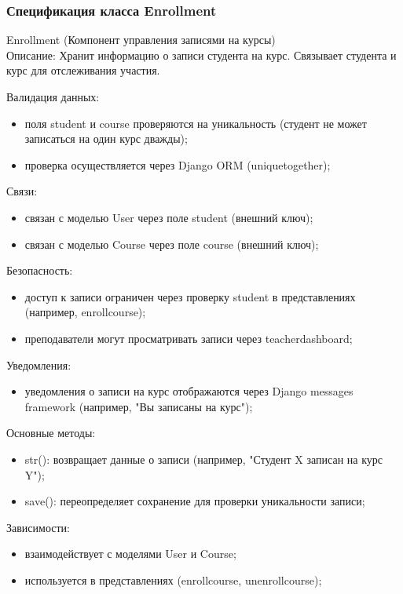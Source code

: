 \subsubsection{Спецификация класса Enrollment}
Enrollment (Компонент управления записями на курсы) \\
Описание: Хранит информацию о записи студента на курс. Связывает студента и курс для отслеживания участия.

Валидация данных: 
\begin{itemize}
	\item поля student и course проверяются на уникальность (студент не может записаться на один курс дважды); 
	\item проверка осуществляется через Django ORM (uniquetogether); 
\end{itemize}

Связи: 
\begin{itemize}
	\item связан с моделью User через поле student (внешний ключ); 
	\item связан с моделью Course через поле course (внешний ключ); 
\end{itemize}

Безопасность: 
\begin{itemize}
	\item доступ к записи ограничен через проверку student в представлениях (например, enrollcourse); 
	\item преподаватели могут просматривать записи через teacherdashboard; 
\end{itemize}

Уведомления: 
\begin{itemize}
	\item уведомления о записи на курс отображаются через Django messages framework (например, "Вы записаны на курс"); 
\end{itemize}

Основные методы: 
\begin{itemize}
	\item str(): возвращает данные о записи (например, "Студент X записан на курс Y"); 
	\item save(): переопределяет сохранение для проверки уникальности записи; 
\end{itemize}

Зависимости: 
\begin{itemize}
	\item взаимодействует с моделями User и Course; 
	\item используется в представлениях (enrollcourse, unenrollcourse); 
\end{itemize}


